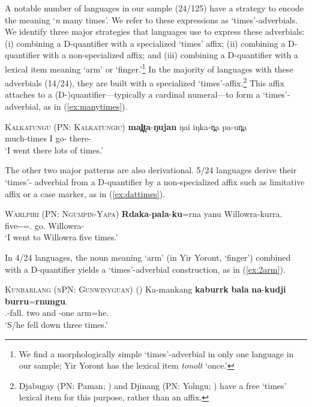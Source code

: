 \documentclass[12pt,egregdoesnotlikesansseriftitles]{scrartcl}
\begin{document}



A notable number of languages in our sample (24/125) have a strategy to encode the meaning `\textit{n} many times'. We refer to these expressions as `times'-adverbials. We identify three major strategies that languages use to express these adverbials: (i) combining a D-quantifier with a specialized `times' affix; (ii) combining a D-quantifier with a non-specialized affix; and (iii) combining a D-quantifier with a lexical item meaning `arm' or `finger.'\footnote{We find a morphologically simple `times'-adverbial in only one language in our sample; Yir Yoront  has the lexical item \textit{tonolt} `once.'}  In the majority of languages with  these adverbials (14/24), they are built with a specialized `times'-affix.\footnote{Djabugay (PN: Paman; \citealt{patz91}) and Djinang (PN: Yolngu; \citealt{waters83}) have a free `times' lexical item for this purpose, rather than an affix.} This affix attaches to a (D-)quantifier---typically a cardinal numeral---to form a `times'- adverbial, as in (\ref{ex:manytimes}). 
\begin{exe}
  \ex\label{ex:manytimes} \textsc{Kalkatungu (PN: Kalkatungic)}\hfill {}
  \gll \textbf{mal̪t̪a}-\textbf{ŋujan} ŋai iŋka-n̪a pa-un̪a\\
  much-times I go-\Pst{} there-\All\\
  \glt `I went there lots of times.'
\end{exe}

The other two major patterns are also derivational. 5/24 languages derive their `times'- adverbial from a D-quantifier by a non-specialized affix such as limitative affix or a case marker, as in  (\ref{ex:dattimes}).
\begin{exe}
  \ex\label{ex:dattimes} \textsc{Warlpiri (PN: Ngumpin-Yapa)}\hfill {}
  \gll \textbf{Rdaka}-\textbf{pala}-\textbf{ku}=rna yanu Willowra-kurra.\\
  five-\Card-\Dat=\Fsg.\Sbj{} go.\Pst{} Willowra-\All\\
  \glt `I went to Willowra five times.'
\end{exe}
  
In 4/24 languages, the noun meaning `arm' (in Yir Yoront, `finger') combined with a D-quantifier yields a `times'-adverbial construction, as in (\ref{ex:2arm}). %
\begin{exe}
  \ex\label{ex:2arm} \textsc{Kunbarlang (nPN: Gunwinyguan)} \hfill (\citealt{ikthesis})
  \gll Ka-mankang \textbf{kaburrk} \textbf{bala} \textbf{na}-\textbf{kudji} \textbf{burru}=\textbf{rnungu}.\\
  \Tsg.\Nfut-fall.\Pst{} two and \Cli-one arm=he.\Gen\\
  \glt `S/he fell down three times.' %
\end{exe}
\end{document}
